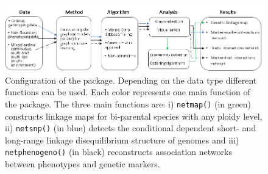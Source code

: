 \begin{figure}[t]
	\hspace{-0.5cm}
	\includegraphics[width=1.08\textwidth]{Fig1_workflow.png} 
	\caption{Configuration of the  package. Depending on the data type different functions can be used. Each color represents one main function of the package. The three main functions are: i) {\tt netmap()} (in green) constructs linkage maps for bi-parental species with any ploidy level, ii) {\tt netsnp()} (in blue) detects the conditional dependent short- and long-range linkage disequilibrium structure of genomes and iii) {\tt netphenogeno()} (in black) reconstructs  association networks between phenotypes and genetic markers.}
	\label{Flowchart}
\end{figure} 

